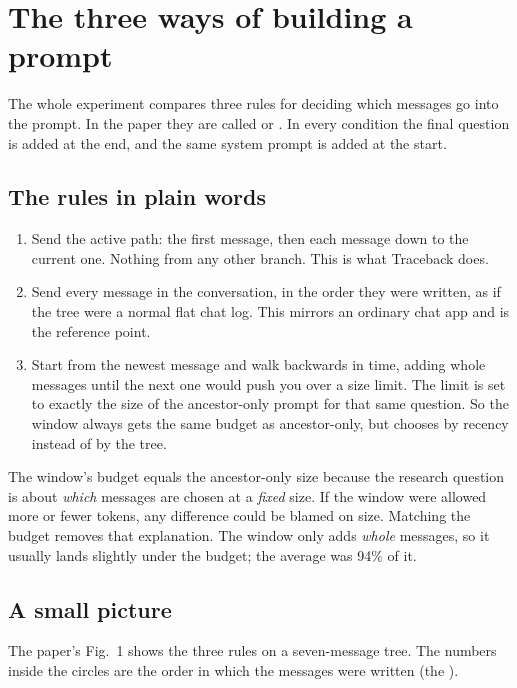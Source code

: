 \chapter{The three ways of building a prompt}

The whole experiment compares three rules for deciding which messages go into the prompt. In the paper they are called  or . In every condition the final question is added at the end, and the same system prompt is added at the start.

\section{The rules in plain words}

\begin{enumerate}
\item {} Send the active path: the first message, then each message down to the current one. Nothing from any other branch. This is what Traceback does.
\item {} Send every message in the conversation, in the order they were written, as if the tree were a normal flat chat log. This mirrors an ordinary chat app and is the reference point.
\item {} Start from the newest message and walk backwards in time, adding whole messages until the next one would push you over a size limit. The limit is set to exactly the size of the ancestor-only prompt for that same question. So the window always gets the same budget as ancestor-only, but chooses by recency instead of by the tree.
\end{enumerate}

\begin{why}
The window's budget equals the ancestor-only size because the research question is about \emph{which} messages are chosen at a \emph{fixed} size. If the window were allowed more or fewer tokens, any difference could be blamed on size. Matching the budget removes that explanation. The window only adds \emph{whole} messages, so it usually lands slightly under the budget; the average was 94\% of it.
\end{why}

\section{A small picture}

The paper's Fig.~1 shows the three rules on a seven-message tree. The numbers inside the circles are the order in which the messages were written (the ).

